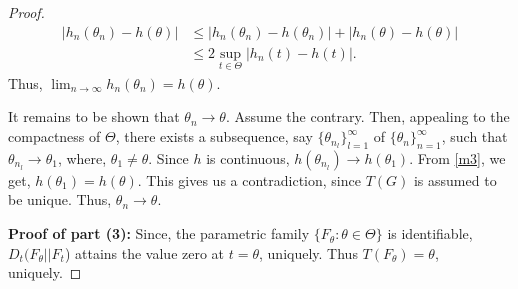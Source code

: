 \documentclass{article}
\begin{document}
\begin{proof}
    \begin{align}
    |h_n(\theta_n)-h(\theta)| \nonumber & \leq |h_n(\theta_n)-h(\theta_n)|+|h_n(\theta)-h(\theta)| \nonumber\\
    & \leq 2 \sup_{t \in \Theta} |h_n(t)-h(t)|. \label{m3}
    \end{align}
    Thus, $\lim_{n \to \infty} h_n(\theta_n)=h(\theta)$.\par 
    It remains to be shown that $\theta_n \to \theta$. Assume the contrary. Then, appealing to the compactness of $\Theta$, there exists a subsequence, say $\{\theta_{n_l}\}_{l=1}^\infty$ of $\{\theta_{n}\}_{n=1}^\infty$, such that $\theta_{n_l} \to \theta_1$, where, $\theta_1 \neq \theta$. Since $h$ is continuous, $h(\theta_{n_l}) \to h(\theta_1)$. From \eqref{m3}, we get, $h(\theta_1)=h(\theta)$. This gives us a contradiction, since $T(G)$ is assumed to be unique. Thus, $\theta_n \to \theta$.\par
    \textbf{Proof of part (3):}
        Since, the parametric family $\{F_\theta: \theta \in \Theta\}$ is identifiable, $D_t(F_\theta||F_{t}$) attains the value zero at $t=\theta$, uniquely. Thus $T(F_\theta)=\theta$, uniquely. 
\end{proof}
\end{document}
